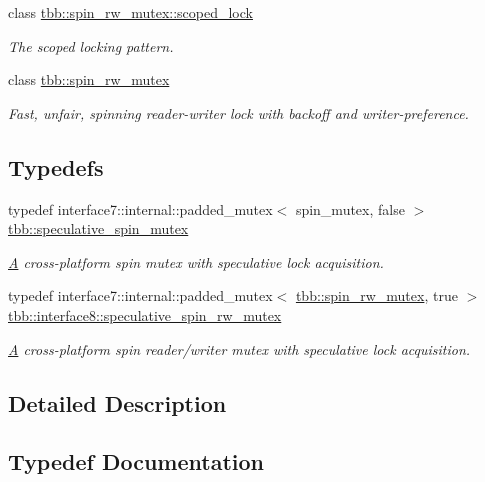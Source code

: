 \begin{DoxyCompactItemize}
class \hyperlink{classtbb_1_1spin__rw__mutex_1_1scoped__lock}{tbb\+::spin\+\_\+rw\+\_\+mutex\+::scoped\+\_\+lock}
\begin{DoxyCompactList}\small\item\em The scoped locking pattern. \end{DoxyCompactList}\item 
class \hyperlink{classtbb_1_1spin__rw__mutex}{tbb\+::spin\+\_\+rw\+\_\+mutex}
\begin{DoxyCompactList}\small\item\em Fast, unfair, spinning reader-\/writer lock with backoff and writer-\/preference. \end{DoxyCompactList}\end{DoxyCompactItemize}
\subsection*{Typedefs}
\begin{DoxyCompactItemize}
\item 
typedef interface7\+::internal\+::padded\+\_\+mutex$<$ spin\+\_\+mutex, false $>$ \hyperlink{group__synchronization_gaaa37cbd66059817a12393e6ff53ae3be}{tbb\+::speculative\+\_\+spin\+\_\+mutex}
\begin{DoxyCompactList}\small\item\em \hyperlink{structA}{A} cross-\/platform spin mutex with speculative lock acquisition. \end{DoxyCompactList}\item 
typedef interface7\+::internal\+::padded\+\_\+mutex$<$ \hyperlink{classtbb_1_1spin__rw__mutex}{tbb\+::spin\+\_\+rw\+\_\+mutex}, true $>$ \hyperlink{group__synchronization_ga802372513021fc3ba3741c387b294987}{tbb\+::interface8\+::speculative\+\_\+spin\+\_\+rw\+\_\+mutex}
\begin{DoxyCompactList}\small\item\em \hyperlink{structA}{A} cross-\/platform spin reader/writer mutex with speculative lock acquisition. \end{DoxyCompactList}\end{DoxyCompactItemize}


\subsection{Detailed Description}


\subsection{Typedef Documentation}
\hypertarget{group__synchronization_gaaa37cbd66059817a12393e6ff53ae3be}{}
